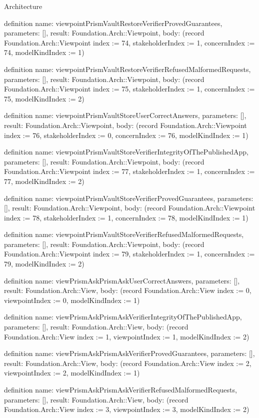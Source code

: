 \begin{lexlean}{Architecture}
\begin{semanticmodule}
definition{
  name: viewpointPrismVaultRestoreVerifierProvedGuarantees,
  parameters: [],
  result: Foundation.Arch::Viewpoint,
  body: (record Foundation.Arch::Viewpoint {index := 74, stakeholderIndex := 1, concernIndex := 74, modelKindIndex := 1})
}

definition{
  name: viewpointPrismVaultRestoreVerifierRefusedMalformedRequests,
  parameters: [],
  result: Foundation.Arch::Viewpoint,
  body: (record Foundation.Arch::Viewpoint {index := 75, stakeholderIndex := 1, concernIndex := 75, modelKindIndex := 2})
}

definition{
  name: viewpointPrismVaultStoreUserCorrectAnswers,
  parameters: [],
  result: Foundation.Arch::Viewpoint,
  body: (record Foundation.Arch::Viewpoint {index := 76, stakeholderIndex := 0, concernIndex := 76, modelKindIndex := 1})
}

definition{
  name: viewpointPrismVaultStoreVerifierIntegrityOfThePublishedApp,
  parameters: [],
  result: Foundation.Arch::Viewpoint,
  body: (record Foundation.Arch::Viewpoint {index := 77, stakeholderIndex := 1, concernIndex := 77, modelKindIndex := 2})
}

definition{
  name: viewpointPrismVaultStoreVerifierProvedGuarantees,
  parameters: [],
  result: Foundation.Arch::Viewpoint,
  body: (record Foundation.Arch::Viewpoint {index := 78, stakeholderIndex := 1, concernIndex := 78, modelKindIndex := 1})
}

definition{
  name: viewpointPrismVaultStoreVerifierRefusedMalformedRequests,
  parameters: [],
  result: Foundation.Arch::Viewpoint,
  body: (record Foundation.Arch::Viewpoint {index := 79, stakeholderIndex := 1, concernIndex := 79, modelKindIndex := 2})
}

definition{
  name: viewPrismAskPrismAskUserCorrectAnswers,
  parameters: [],
  result: Foundation.Arch::View,
  body: (record Foundation.Arch::View {index := 0, viewpointIndex := 0, modelKindIndex := 1})
}

definition{
  name: viewPrismAskPrismAskVerifierIntegrityOfThePublishedApp,
  parameters: [],
  result: Foundation.Arch::View,
  body: (record Foundation.Arch::View {index := 1, viewpointIndex := 1, modelKindIndex := 2})
}

definition{
  name: viewPrismAskPrismAskVerifierProvedGuarantees,
  parameters: [],
  result: Foundation.Arch::View,
  body: (record Foundation.Arch::View {index := 2, viewpointIndex := 2, modelKindIndex := 1})
}

definition{
  name: viewPrismAskPrismAskVerifierRefusedMalformedRequests,
  parameters: [],
  result: Foundation.Arch::View,
  body: (record Foundation.Arch::View {index := 3, viewpointIndex := 3, modelKindIndex := 2})
}


\end{semanticmodule}
\end{lexlean}
